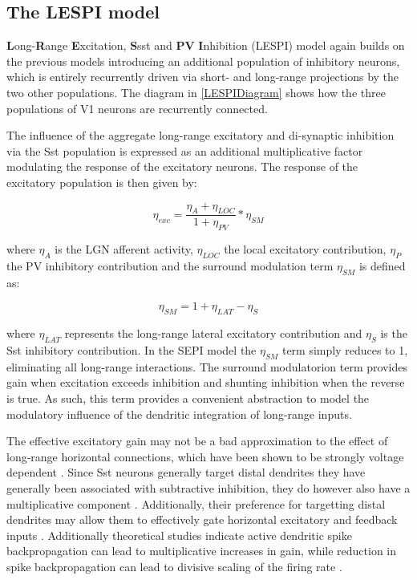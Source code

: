 \subsection{The LESPI model}

\textbf{L}ong-\textbf{R}ange \textbf{E}xcitation, \textbf{S}sst and
\textbf{PV} \textbf{I}nhibition (LESPI) model again builds on the
previous models introducing an additional population of inhibitory
neurons, which is entirely recurrently driven via short- and
long-range projections by the two other populations. The diagram in
\ref{LESPIDiagram} shows how the three populations of V1 neurons are
recurrently connected.

The influence of the aggregate long-range excitatory and di-synaptic
inhibition via the Sst population is expressed as an additional
multiplicative factor modulating the response of the excitatory
neurons. The response of the excitatory population is then given by:

\begin{equation}
  \eta_{exc} = \frac{\eta_{A} + \eta_{LOC}}{1 + \eta_{PV}} * \eta_{SM}
\end{equation}

where $\eta_{A}$ is the LGN afferent activity, $\eta_{LOC}$ the local
excitatory contribution, $\eta_{P}$ the PV inhibitory contribution
and the surround modulation term $\eta_{SM}$ is defined as:

\begin{equation}
  \eta_{SM} = 1 + \eta_{LAT} - \eta_{S}
\end{equation}

where $\eta_{LAT}$ represents the long-range lateral excitatory
contribution and $\eta_{S}$ is the Sst inhibitory contribution. In the
SEPI model the $\eta_{SM}$ term simply reduces to 1, eliminating all
long-range interactions. The surround modulatorion term provides gain
when excitation exceeds inhibition and shunting inhibition when the
reverse is true. As such, this term provides a convenient abstraction
to model the modulatory influence of the dendritic integration of
long-range inputs.

The effective excitatory gain may not be a bad approximation to the
effect of long-range horizontal connections, which have been shown to
be strongly voltage dependent \citep{Hirsch1991}. Since Sst neurons
generally target distal dendrites they have generally been associated
with subtractive inhibition, they do however also have a
multiplicative component \citep{Wilson2012}. Additionally, their
preference for targetting distal dendrites may allow them to
effectively gate horizontal excitatory and feedback inputs
\citep{Ma2011, Gentet2012}. Additionally theoretical studies indicate
active dendritic spike backpropagation can lead to multiplicative
increases in gain, while reduction in spike backpropagation can lead
to divisive scaling of the firing rate \citep{Mehaffey2005}.


